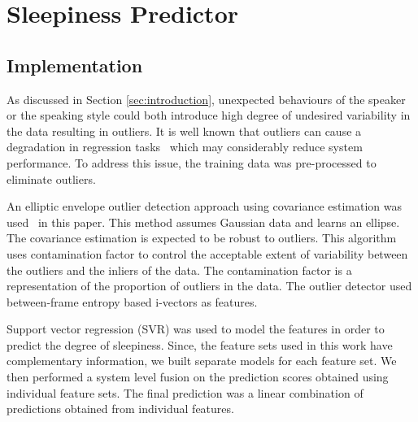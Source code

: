 
\section{Sleepiness Predictor}

\subsection{Implementation}
As discussed in Section \ref{sec:introduction}, unexpected behaviours of the speaker or the speaking style could both introduce high degree of undesired variability in the data resulting in outliers. It is well known that outliers can cause a degradation in regression tasks~\cite{bollen1985regression} which may considerably reduce system performance. To address this issue, the training data was pre-processed to eliminate outliers.  %

An elliptic envelope outlier detection approach using covariance estimation was used~\cite{rousseeuw1999fast} in this paper. This method assumes Gaussian data and learns an ellipse. The covariance estimation is expected to be robust to outliers. This algorithm uses contamination factor to control the acceptable extent of variability between the outliers and the inliers of the data. The contamination factor is a representation of the proportion of outliers in the data. The outlier detector used between-frame entropy based i-vectors as features. 


Support vector regression (SVR) \cite{drucker1997support} was used to model the features in order to predict the degree of sleepiness.
Since, the feature sets used in this work have complementary information, we built separate models for each feature set. We then performed a system level fusion on the prediction scores obtained using individual feature sets. The final prediction was a linear combination of predictions obtained from individual features. 

